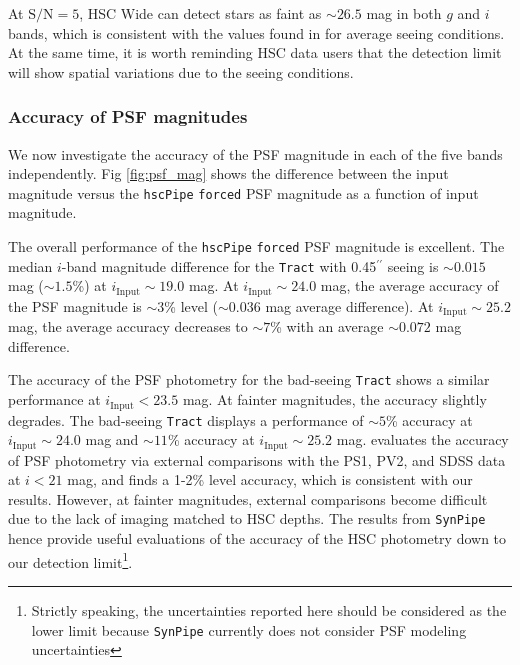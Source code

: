 \documentclass[useamsfonts]{pasj01}
\def\asec{$^{\prime\prime}$}
\def\hscpipe{\texttt{hscPipe}}
\def\synpipe{\texttt{SynPipe}}
\def\forced{\texttt{forced}}
\def\tract{\texttt{Tract}}
\def\s2n{{$\mathrm{S}/\mathrm{N}$}}
\begin{document}
    At \s2n{}$=5$, HSC Wide can detect stars as faint as ${\sim}26.5$ mag in both $g$ 
    and $i$ bands, which is consistent with the values found in \citet{HSCDR1} for 
    average seeing conditions.
    At the same time, it is worth reminding HSC data users that the detection
    limit will show spatial variations due to the seeing conditions.

\subsubsection{Accuracy of PSF magnitudes}

    We now investigate the accuracy of the PSF magnitude in each of the five bands
    independently. 
    Fig \ref{fig:psf_mag} shows the difference between the input magnitude versus the
    \hscpipe{} \forced{} PSF magnitude as a function of input magnitude. 
    
    The overall performance of the \hscpipe{} \forced{} PSF magnitude is excellent. 
    The median $i$-band magnitude difference for the \tract{} with 0.45\asec{} seeing 
    is ${\sim}0.015$ mag (${\sim}1.5$\%) at $i_{\mathrm{Input}}{\sim}19.0$ mag. 
    At $i_{\mathrm{Input}}{\sim}24.0$ mag, the average accuracy of the PSF magnitude is 
    ${\sim}3$\% level (${\sim}0.036$ mag average difference).
    At $i_{\mathrm{Input}}{\sim}25.2$ mag, the average accuracy decreases to
    ${\sim}7$\% with an average ${\sim}0.072$ mag difference.
    
    The accuracy of the PSF photometry for the bad-seeing \tract{} shows a similar 
    performance at $i_{\mathrm{Input}}<23.5$ mag. 
    At fainter magnitudes, the accuracy slightly degrades. 
    The bad-seeing \tract{} displays a performance of ${\sim}5$\% accuracy at
    $i_{\mathrm{Input}}{\sim}24.0$ mag and ${\sim}11$\% accuracy at
    $i_{\mathrm{Input}}{\sim}25.2$ mag.
    \citet{HSCDR1} evaluates the accuracy of PSF photometry via external comparisons
    with the PS1, PV2, and SDSS data at $i<21$ mag, and finds a 1-2\% level accuracy,
    which is consistent with our results. 
    However, at fainter magnitudes, external comparisons become difficult due to the 
    lack of imaging matched to HSC depths.
    The results from \synpipe{} hence provide useful evaluations of the accuracy of 
    the HSC photometry down to our detection limit\footnote{Strictly speaking, the 
    uncertainties reported here should be considered as the lower limit because 
    \synpipe{} currently does not consider PSF modeling uncertainties}.
\end{document}
